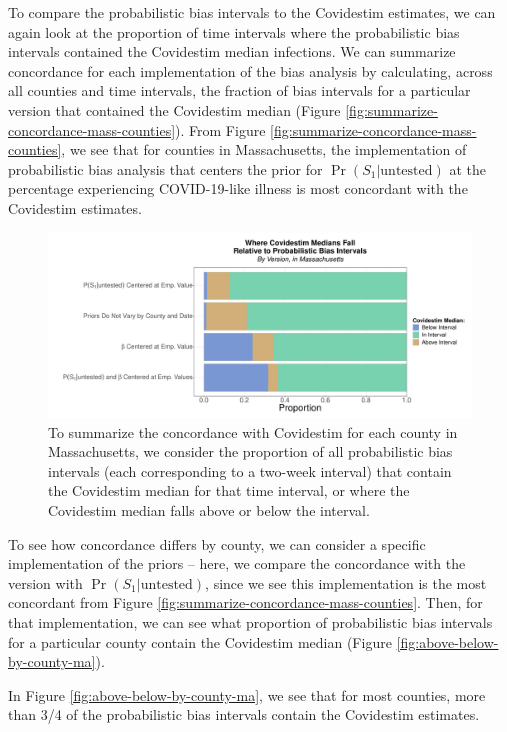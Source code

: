 \documentclass[12pt,twoside]{smiththesis}
\begin{document}
To compare the probabilistic bias intervals to the Covidestim estimates, we can again look at the proportion of time intervals where the probabilistic bias intervals contained the Covidestim median infections. We can summarize concordance for each implementation of the bias analysis by calculating, across all counties and time intervals, the fraction of bias intervals for a particular version that contained the Covidestim median (Figure \ref{fig:summarize-concordance-mass-counties}). From Figure \ref{fig:summarize-concordance-mass-counties}, we see that for counties in Massachusetts, the implementation of probabilistic bias analysis that centers the prior for \(\Pr(S_1|\text{untested})\) at the percentage experiencing COVID-19-like illness is most concordant with the Covidestim estimates.
\begin{figure}
\includegraphics[width=1\linewidth]{figure/summarize-concordance-mass-counties} \caption{\label{fig:summarize-concordance-mass-counties} To summarize the concordance with Covidestim for each county in Massachusetts, we consider the proportion of all probabilistic bias intervals (each corresponding to a two-week interval) that contain the Covidestim median for that time interval, or where the Covidestim median falls above or below the interval.}\label{fig:unnamed-chunk-80}
\end{figure}
To see how concordance differs by county, we can consider a specific implementation of the priors -- here, we compare the concordance with the version with \(\Pr(S_1|\text{untested})\), since we see this implementation is the most concordant from Figure \ref{fig:summarize-concordance-mass-counties}. Then, for that implementation, we can see what proportion of probabilistic bias intervals for a particular county contain the Covidestim median (Figure \ref{fig:above-below-by-county-ma}).

In Figure \ref{fig:above-below-by-county-ma}, we see that for most counties, more than 3/4 of the probabilistic bias intervals contain the Covidestim estimates.
\end{document}
